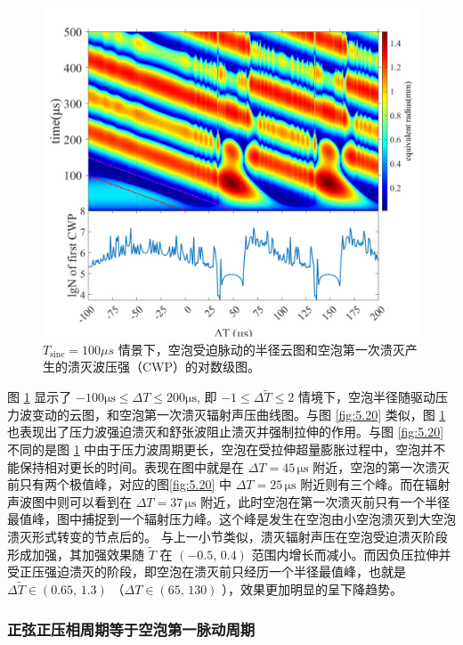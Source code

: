 \begin{figure}[H]
  \centering
  \includegraphics[width=0.9\linewidth]{img/fig5.21-eps-converted-to.pdf}
  \caption{$T_\mathrm{sine}=100 \mu s$
情景下，空泡受迫脉动的半径云图和空泡第一次溃灭产生的溃灭波压强（CWP）的对数级图。}
  \label{fig:5.21}
\end{figure}


图 \ref{fig:5.21} 显示了 $-100\mathrm{\mu s}\leq\Delta T\leq200\mathrm{\mu s}$,
即 $-1\leq\Delta \tilde{T} \leq2$
情境下，空泡半径随驱动压力波变动的云图，和空泡第一次溃灭辐射声压曲线图。与图
\ref{fig:5.20} 类似，图 \ref{fig:5.21} 
也表现出了压力波强迫溃灭和舒张波阻止溃灭并强制拉伸的作用。与图 \ref{fig:5.20} 
不同的是图 \ref{fig:5.21} 
中由于压力波周期更长，空泡在受拉伸超量膨胀过程中，空泡并不能保持相对更长的时间。表现在图中就是在
$\Delta T=45\,\mathrm{\mu s}$
附近，空泡的第一次溃灭前只有两个极值峰，对应的图\ref{fig:5.20} 中
$\Delta T=25\,\mathrm{\mu s}$
附近则有三个峰。而在辐射声波图中则可以看到在
$\Delta T=37\,\mathrm{\mu s}$
附近，此时空泡在第一次溃灭前只有一个半径最值峰，图中捕捉到一个辐射压力峰。这个峰是发生在空泡由小空泡溃灭到大空泡溃灭形式转变的节点后的。
与上一小节类似，溃灭辐射声压在空泡受迫溃灭阶段形成加强，其加强效果随
$\tilde{T}$ 在 $(-0.5, \,0.4)$
范围内增长而减小。而因负压拉伸并受正压强迫溃灭的阶段，即空泡在溃灭前只经历一个半径最值峰，也就是
$\Delta \tilde{T}\in (0.65,\,1.3)$ （$\Delta T \in (65,\,130)$
），效果更加明显的呈下降趋势。

\medskip
\bigskip
\subsubsection{正弦正压相周期等于空泡第一脉动周期}


